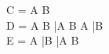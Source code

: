 \documentclass{article}
\begin{document}
C = A \cap B \\
D = A \cap B \cup \bar{A} \cap B \cup A \cap \bar{B} \\
E = A \cap \bar{B} \cup \bar{A} \cap B
\end{document}

